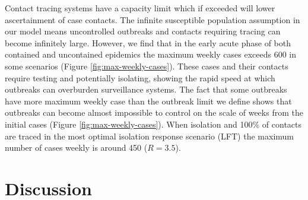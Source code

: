 \documentclass{article}
\begin{document}
Contact tracing systems have a capacity limit which if exceeded will lower ascertainment of case contacts. The infinite susceptible population assumption in our model means uncontrolled outbreaks and contacts requiring tracing can become infinitely large. However, we find that in the early acute phase of both contained and uncontained epidemics the maximum weekly cases exceeds 600 in some scenarios (Figure \ref{fig:max-weekly-cases}). These cases and their contacts require testing and potentially isolating, showing the rapid speed at which outbreaks can overburden surveillance systems. The fact that some outbreaks have more maximum weekly case than the outbreak limit we define shows that outbreaks can become almost impossible to control on the scale of weeks from the initial cases (Figure \ref{fig:max-weekly-cases}). When isolation and 100\% of contacts are traced in the most optimal isolation response scenario (LFT) the maximum number of cases weekly is around 450 ($R = 3.5$).

\section*{Discussion}
\end{document}
